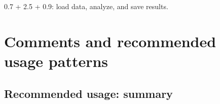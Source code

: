 \documentclass[a4paper,11pt]{article}
\begin{document}
\begin{center}
\begin{threeparttable}
\begin{tablenotes}
{    %
    \item[a] 0.7 + 2.5 + 0.9: load data, analyze, and save results.
    }
  \end{tablenotes}

\end{threeparttable}
\end{center}




            





\clearpage
\section{Comments and recommended usage patterns}
\label{commentsend}


\subsection{Recommended usage: summary}\label{comments-summary}
\end{document}
